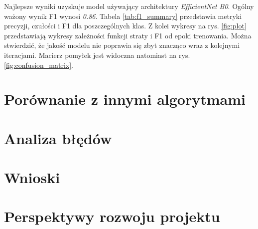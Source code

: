 Najlepsze wyniki uzyskuje model używający architektury \textit{EfficientNet B0}. Ogólny ważony wynik F1 wynosi \textit{0.86}.
Tabela \ref{tab:f1_summary} przedstawia metryki precyzji, czułości i F1 dla poszczególnych klas.
Z kolei wykresy na rys. \ref{fig:plot} przedstawiają wykresy zależności funkcji straty i F1 od epoki trenowania.
Można stwierdzić, że jakość modelu nie poprawia się zbyt znacząco wraz z kolejnymi iteracjami.
Macierz pomyłek jest widoczna natomiast na rys. \ref{fig:confusion_matrix}.

\section{Porównanie z innymi algorytmami}

\section{Analiza błędów}

\section{Wnioski}

\section{Perspektywy rozwoju projektu}